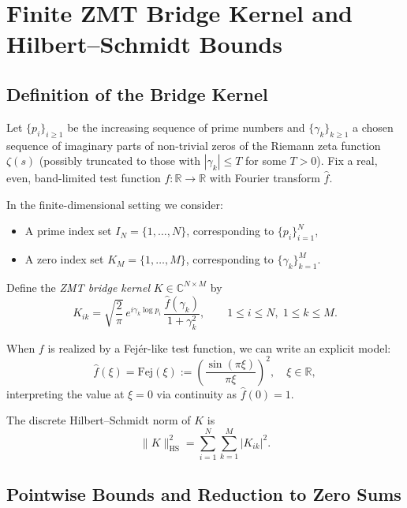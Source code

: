 \documentclass[11pt]{article}
\begin{document}
\section{Finite ZMT Bridge Kernel and Hilbert--Schmidt Bounds}

\subsection{Definition of the Bridge Kernel}

Let $\{p_i\}_{i\ge 1}$ be the increasing sequence of prime numbers and $\{\gamma_k\}_{k\ge 1}$ a chosen sequence of imaginary parts of non-trivial zeros of the Riemann zeta function $\zeta(s)$ (possibly truncated to those with $|\gamma_k|\le T$ for some $T>0$). Fix a real, even, band-limited test function $f:\mathbb{R}\to\mathbb{R}$ with Fourier transform $\widehat{f}$.

In the finite-dimensional setting we consider:

\begin{itemize}
  \item A prime index set $I_N = \{1,\dots,N\}$, corresponding to $\{p_i\}_{i=1}^N$,
  \item A zero index set $K_M = \{1,\dots,M\}$, corresponding to $\{\gamma_k\}_{k=1}^M$.
\end{itemize}

Define the \emph{ZMT bridge kernel} $K\in \mathbb{C}^{N\times M}$ by
\begin{equation}
  K_{ik}
    = \sqrt{\frac{2}{\pi}}
      \,e^{i\gamma_k \log p_i}
      \,\frac{\widehat{f}(\gamma_k)}{1+\gamma_k^2},
  \qquad 1\le i\le N,\;1\le k\le M.
  \label{eq:K-def}
\end{equation}

When $f$ is realized by a Fejér-like test function, we can write an explicit model:
\begin{equation}
  \widehat{f}(\xi)
    = \mathrm{Fej}(\xi)
    := \left(\frac{\sin(\pi \xi)}{\pi \xi}\right)^2,
  \quad \xi\in\mathbb{R},
  \label{eq:Fejer-hat}
\end{equation}
interpreting the value at $\xi=0$ via continuity as $\widehat{f}(0)=1$.

The discrete Hilbert--Schmidt norm of $K$ is
\begin{equation}
  \|K\|_{\mathrm{HS}}^2
    = \sum_{i=1}^N\sum_{k=1}^M |K_{ik}|^2.
  \label{eq:HS-def}
\end{equation}

\subsection{Pointwise Bounds and Reduction to Zero Sums}
\end{document}

